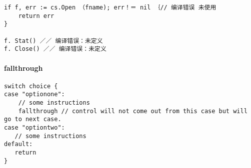 \begin{verbatim}
if f, err := cs.Open （fname); err！＝ nil ｛// 编译错误 未使用
    return err 
}

f. Stat() ／／ 编译错误：未定义
f. Close() ／／ 编译错误：未定义
\end{verbatim}

\hypertarget{fallthrough}{%
\paragraph{fallthrough}\label{fallthrough}}

\begin{verbatim}
switch choice {
case "optionone":
    // some instructions 
    fallthrough // control will not come out from this case but will go to next case.
case "optiontwo":
   // some instructions 
default: 
   return 
}
\end{verbatim}
